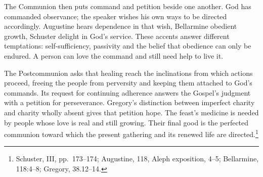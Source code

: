 The Communion then puts command and petition beside one another.
God has commanded observance; the speaker wishes his own ways to be
directed accordingly. Augustine hears dependence in that wish,
Bellarmine obedient growth, Schuster delight in God's service. These
accents answer different temptations: self-sufficiency, passivity and
the belief that obedience can only be endured. A person can love the
command and still need help to live it.

The Postcommunion asks that healing reach the inclinations from which
actions proceed, freeing the people from perversity and keeping them
attached to God's commands. Its request for continuing adherence answers
the Gospel's judgment with a petition for perseverance. Gregory's
distinction between imperfect charity and charity wholly absent gives
that petition hope. The feast's medicine is needed by people whose
love is real and still growing. Their final good is the perfected
communion toward which the present gathering and its renewed life
are directed.\footnote{Schuster,  III, pp.~173--174;
Augustine,  118, Aleph exposition, 4--5;
Bellarmine,  118:4--8; Gregory, 
38.12--14.}
\clearpage
